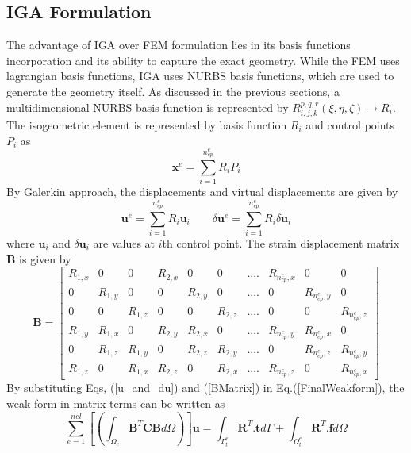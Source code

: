 \documentclass[11pt]{article}
\begin{document}
\subsection{IGA Formulation}
The advantage of IGA over FEM formulation lies in its basis functions
incorporation and its ability to capture the exact geometry. While the FEM uses lagrangian basis functions, IGA uses NURBS basis functions, which are used to generate the geometry itself. As discussed in the previous sections, a multidimensional NURBS basis function is represented by
$R_{i,j,k}^{p,q,r}(\xi,\eta,\zeta) \rightarrow R_i$. The isogeometric element 
is represented by basis function $R_i$ and control points $P_i$ as \cite{agrawal2019iga}
\begin{equation} \label{Co-ordinate}
\textbf{x}^e = \sum_{i=1}^{n_{cp}^e} R_i P_i
\end{equation} 
By Galerkin approach, the displacements and virtual displacements are given by
\begin{equation} \label{u_and_du}
\textbf{u}^e = \sum_{i=1}^{n_{cp}^e} R_i \textbf{u}_i \qquad \delta\textbf{u}^e
= \sum_{i=1}^{n_{cp}^e} R_i \delta\textbf{u}_i
\end{equation}
where $\textbf{u}_i$ and $\delta\textbf{u}_i$ are values at $i$th control point.
The strain displacement matrix \textbf{B} is given by
\begin{equation} \label{BMatrix}
\textbf{B} =
\begin{bmatrix}
R_{1,x} & 0 & 0 & R_{2,x} & 0 & 0 & .... & R_{n_{cp}^e,x} & 0 & 0 \\
0 &R_{1,y} & 0 & 0 & R_{2,y} & 0 & .... & 0 & R_{n_{cp}^e,y} & 0  \\
0 & 0 & R_{1,z} &0 & 0 & R_{2,z} & .... &0 & 0 & R_{n_{cp}^e,z}  \\
R_{1,y} & R_{1,x} & 0 & R_{2,y} & R_{2,x} & 0 & .... & R_{n_{cp}^e,y} &
R_{n_{cp}^e,x} & 0 \\
0 & R_{1,z} & R_{1,y} & 0 & R_{2,z} & R_{2,y} & .... & 0 & R_{n_{cp}^e,z} &
R_{n_{cp}^e,y}\\
R_{1,z} &0 & R_{1,x} & R_{2,z} &0 & R_{2,x} & .... &R_{n_{cp}^e,z} &0
&R_{n_{cp}^e,x}
\end{bmatrix}
\end{equation}
By substituting Eqs, (\ref{u_and_du}) and (\ref{BMatrix}) in
Eq.(\ref{FinalWeakform}), the weak form in matrix terms can be written as
\begin{equation} \label{MatrixWeakForm}
\sum_{e=1}^{nel} \left[ \left( \int_{\Omega_e} \textbf{B}^T \textbf{C}
\textbf{B} d\Omega \right) \right] \textbf{u} = \int_{\Gamma^e_t}
\textbf{R}^T.\textbf{t} d\Gamma + \int_{\Omega^e_t} \textbf{R}^T.\textbf{f}
d\Omega 
\end{equation}
\end{document}
